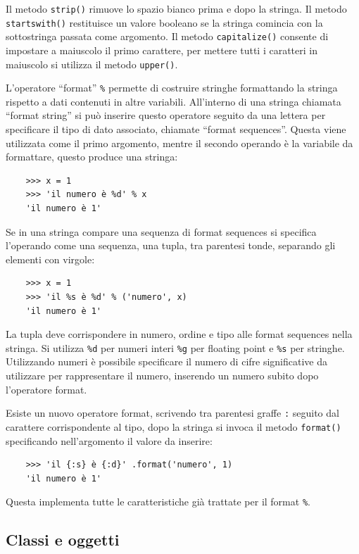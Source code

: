 \documentclass{article}
\numberwithin{equation}{subsection}
\begin{document}
Il metodo \verb|strip()| rimuove lo spazio bianco prima e dopo la stringa. Il metodo \verb|startswith()| restituisce un valore booleano se la stringa comincia 
con la sottostringa passata come argomento. Il metodo \verb|capitalize()| consente di impostare a maiuscolo il primo carattere, per mettere tutti i caratteri in 
maiuscolo si utilizza il metodo \verb|upper()|. 

L'operatore ``format'' \verb|%| permette di costruire stringhe formattando la stringa rispetto a dati contenuti in altre variabili. All'interno di una stringa 
chiamata ``format string'' si può inserire questo operatore seguito da una lettera per specificare il tipo di dato associato, chiamate ``format sequences''. Questa 
viene utilizzata come il primo argomento, mentre il secondo operando è la variabile da formattare, questo produce una stringa:
\begin{verbatim}
    >>> x = 1
    >>> 'il numero è %d' % x
    'il numero è 1' 
\end{verbatim}

Se in una stringa compare una sequenza di format sequences si specifica l'operando come una sequenza, una tupla, tra parentesi tonde, separando gli elementi con virgole:
\begin{verbatim}
    >>> x = 1
    >>> 'il %s è %d' % ('numero', x)
    'il numero è 1' 
\end{verbatim}
La tupla deve corrispondere in numero, ordine e tipo alle format sequences nella stringa. 
Si utilizza \verb|%d| per numeri interi \verb|%g| per floating point e \verb|%s| per stringhe. Utilizzando numeri è possibile specificare il numero di cifre significative da utilizzare per 
rappresentare il numero, inserendo un numero subito dopo l'operatore format. 

Esiste un nuovo operatore format, scrivendo tra parentesi graffe \verb|:| seguito dal carattere corrispondente al tipo, dopo la stringa si invoca il metodo \verb|format()| 
specificando nell'argomento il valore da inserire:
\begin{verbatim}
    >>> 'il {:s} è {:d}' .format('numero', 1)
    'il numero è 1' 
\end{verbatim}
Questa implementa tutte le caratteristiche già trattate per il format \verb|%|. 

\subsection{Classi e oggetti}
\end{document}
